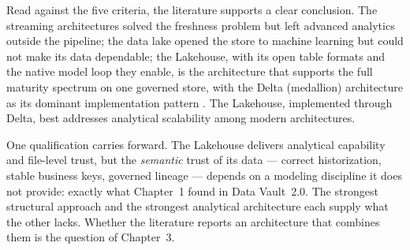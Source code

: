 Read against the five criteria, the literature supports a clear conclusion. The streaming architectures solved the freshness problem but left advanced analytics outside the pipeline; the data lake opened the store to machine learning but could not make its data dependable; the Lakehouse, with its open table formats and the native model loop they enable, is the architecture that supports the full maturity spectrum on one governed store, with the Delta (medallion) architecture as its dominant implementation pattern \parencite{armbrust2021, harby2024, schneider2024, databricks2022}. The Lakehouse, implemented through Delta, best addresses analytical scalability among modern architectures.

One qualification carries forward. The Lakehouse delivers analytical capability and file-level trust, but the \textit{semantic} trust of its data --- correct historization, stable business keys, governed lineage --- depends on a modeling discipline it does not provide: exactly what Chapter~1 found in Data Vault~2.0. The strongest structural approach and the strongest analytical architecture each supply what the other lacks. Whether the literature reports an architecture that combines them is the question of Chapter~3.
